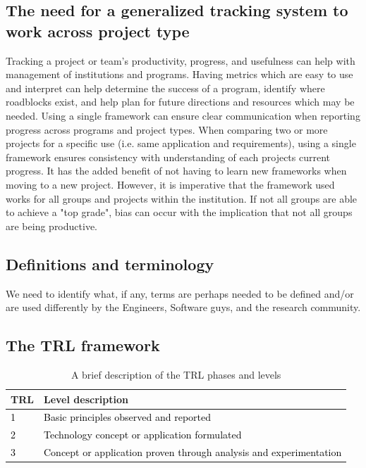 \documentclass[referee,a4paper,12pt,traditabstract]{swsc}
\begin{document}
\begin{linenumbers}
\section{The need for a generalized tracking system to work across project type}
Tracking a project or team's productivity, progress, and usefulness can help with management of institutions and programs. Having metrics which are easy to use and interpret can help determine the success of a program, identify where roadblocks exist, and help plan for future directions and resources which may be needed. Using a single framework can ensure clear communication when reporting progress across programs and project types. When comparing two or more projects for a specific use (i.e. same application and requirements), using a single framework ensures consistency with understanding of each projects current progress. It has the added benefit of not having to learn new frameworks when moving to a new project. However, it is imperative that the framework used works for all groups and projects within the institution. If not all groups are able to achieve a "top grade",  bias can occur with the implication that not all groups are being productive. 

\subsection{Definitions and terminology}

We need to identify what, if any, terms are perhaps needed to be defined and/or are used differently by the Engineers, Software guys, and the research community. 

\subsection{The TRL framework }

\begin{table}
\caption{A brief description of the TRL phases and levels}
\centering
\begin{tabular}{ll}\hline
 TRL & Level description \\
 \hline
 \textcolor{black}{1}& \textcolor{black}{Basic principles observed and reported}\\
 \textcolor{black}{2} & \textcolor{black}{Technology concept or application formulated}\\ 
\textcolor{black}{3} &\textcolor{black}{Concept or application proven through analysis and experimentation} \\


\end{tabular}
\end{table}
\end{linenumbers}
\end{document}
